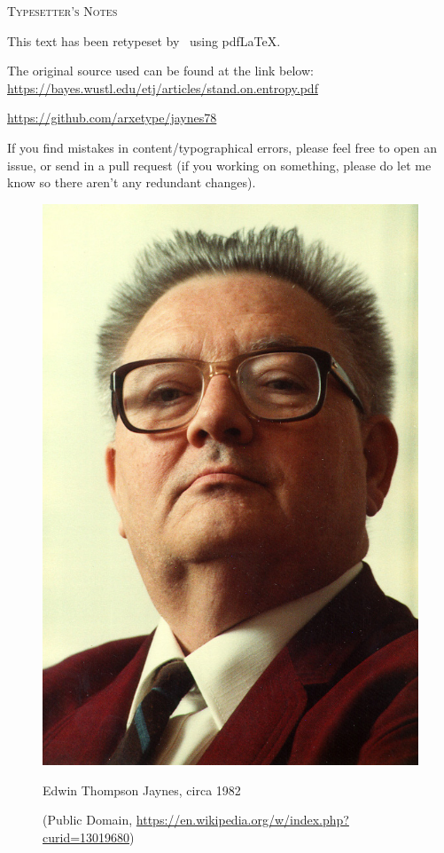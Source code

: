 \clearpage
\thispagestyle{empty}
{\Large \scshape Typesetter's Notes} \hrulefill

This text has been retypeset by \arxetype\ using pdf\LaTeX.

The original source used can be found at the link below: \url{https://bayes.wustl.edu/etj/articles/stand.on.entropy.pdf}

\url{https://github.com/arxetype/jaynes78}

If you find mistakes in content/typographical errors, please feel free to open an issue, or send in a pull request (if you working on something, please do let me know so there aren't any redundant changes).

\vfill

\begin{figure}[htbp]
	\centering
	\includegraphics[scale=0.5]{ETJaynes2}
	\small

	Edwin Thompson Jaynes, circa 1982

	{\footnotesize (Public Domain, \url{https://en.wikipedia.org/w/index.php?curid=13019680}})
\end{figure}

